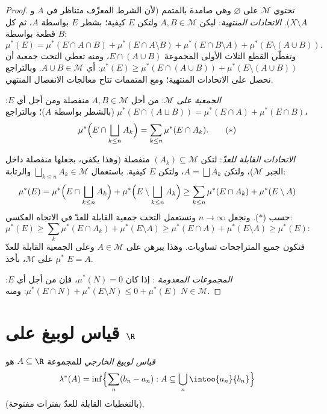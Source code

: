 \begin{proof}
تحتوي $\mathcal M$ على $\varnothing$ وهي صامدة بالمتمم (لأن
الشرط المعرِّف متناظر في $A$ و $X\setminus A$). \emph{الاتحادات
المنتهية}: ليكن $A, B \in \mathcal
M$ ولتكن $E$ كيفية؛ بشطر $E$ بواسطة $A$، ثم
كل قطعة بواسطة $B$:
\[
\mu^*(E) = \mu^*(E\cap A\cap B) + \mu^*(E\cap A\setminus B) +
\mu^*(E\cap B\setminus A) + \mu^*(E\setminus(A\cup B)).
\]
وتغطّي القطع الثلاث الأولى المجموعةَ $E \cap (A \cup B)$، ومنه تعطي التحت
جمعية أن $\mu^*(E) \geq \mu^*(E\cap(A\cup B)) +
\mu^*(E\setminus(A\cup B))$: أي $A \cup B \in \mathcal M$. وبالتراجع نحصل على الاتحادات
المنتهية؛ ومع المتممات تتاح معالجات الانفصال المنتهي.

\emph{الجمعية على $\mathcal M$}: من أجل $A, B \in
\mathcal M$ منفصلة ومن أجل
أي $E$: $\mu^*(E\cap(A\sqcup B)) = \mu^*(E\cap
A) + \mu^*(E \cap B)$ (بالشطر بواسطة $A$)؛ وبالتراجع،
\[
\mu^*\Bigl(E \cap \bigsqcup_{k\leq n}A_k\Bigr)
= \sum_{k\leq n}\mu^*(E\cap A_k).
\tag{$*$}
\]

\emph{الاتحادات القابلة للعدّ}: لتكن $(A_k) \subseteq \mathcal M$ منفصلة (وهذا يكفي، بجعلها
منفصلة داخل الجبر $\mathcal M$)، ولتكن $A = \bigsqcup A_k$، ولتكن $E$ كيفية.
باستعمال $\bigsqcup_{k\leq n}A_k \in \mathcal M$ والرتابة:
\[
\mu^*(E) = \mu^*\Bigl(E\cap\bigsqcup_{k\leq n}A_k\Bigr) +
\mu^*\Bigl(E\setminus\bigsqcup_{k\leq n}A_k\Bigr)
\geq \sum_{k \leq n}\mu^*(E\cap A_k) + \mu^*(E\setminus A)
\]
حسب ($*$). ونجعل $n \to \infty$ ونستعمل التحت جمعية القابلة للعدّ في
الاتجاه العكسي:
\[
\mu^*(E) \geq \sum_{k}\mu^*(E\cap A_k) + \mu^*(E\setminus A)
\geq \mu^*(E \cap A) + \mu^*(E\setminus A) \geq \mu^*(E):
\]
فتكون جميع المتراجحات تساويات. وهذا يبرهن على $A \in
\mathcal M$ وعلى
الجمعية القابلة للعدّ  $\mu^*$ على $\mathcal M$، بأخذ $E = A$.

\emph{المجموعات المعدومة }: إذا كان $\mu^*(N) = 0$، فإن من
أجل أي $E$: $\mu^*(E \cap N) + \mu^*(E\setminus N) \leq 0 + \mu^*(E)$: ومنه $N \in \mathcal M$.
\end{proof}

\section{قياس لوبيغ على \texorpdfstring{$\R$}{R}}

\begin{definition}\label{def:b3:measure:lebesgueouter}
\emph{قياس لوبيغ الخارجي} للمجموعة $A
\subseteq \R$ هو
\[
\lambda^*(A) = \inf\Bigl\{\sum_{n} (b_n - a_n) :
A \subseteq \bigcup_n \intoo{a_n}{b_n}\Bigr\}
\]
(بالتغطيات القابلة للعدّ بفترات مفتوحة).
\end{definition}

